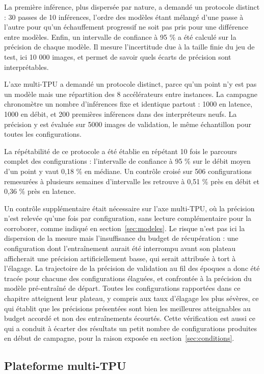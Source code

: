 \documentclass[11pt,a4paper]{report}
\begin{document}
La première inférence, plus dispersée par nature, a demandé un protocole distinct : 30 passes de 10 inférences, l'ordre des modèles étant mélangé d'une passe à l'autre pour qu'un échauffement progressif ne soit pas pris pour une différence entre modèles. Enfin, un intervalle de confiance à 95 \% a été calculé sur la précision de chaque modèle. Il mesure l'incertitude due à la taille finie du jeu de test, ici 10 000 images, et permet de savoir quels écarts de précision sont interprétables.

L'axe multi-TPU a demandé un protocole distinct, parce qu'un point n'y est pas un modèle mais une répartition des 8 accélérateurs entre instances. La campagne chronomètre un nombre d'inférences fixe et identique partout : 1000 en latence, 1000 en débit, et 200 premières inférences dans des interpréteurs neufs. La précision y est évaluée sur 5000 images de validation, le même échantillon pour toutes les configurations.

La répétabilité de ce protocole a été établie en répétant 10 fois le parcours complet des configurations : l'intervalle de confiance à 95 \% sur le débit moyen d'un point y vaut 0,18 \% en médiane. Un contrôle croisé sur 506 configurations remesurées à plusieurs semaines d'intervalle les retrouve à 0,51 \% près en débit et 0,36 \% près en latence.

Un contrôle supplémentaire était nécessaire sur l'axe multi-TPU, où la précision n'est relevée qu'une fois par configuration, sans lecture complémentaire pour la corroborer, comme indiqué en section~\ref{sec:modeles}. Le risque n'est pas ici la dispersion de la mesure mais l'insuffisance du budget de récupération : une configuration dont l'entraînement aurait été interrompu avant son plateau afficherait une précision artificiellement basse, qui serait attribuée à tort à l'élagage. La trajectoire de la précision de validation au fil des époques a donc été tracée pour chacune des configurations élaguées, et confrontée à la précision du modèle pré-entraîné de départ. Toutes les configurations rapportées dans ce chapitre atteignent leur plateau, y compris aux taux d'élagage les plus sévères, ce qui établit que les précisions présentées sont bien les meilleures atteignables au budget accordé et non des entraînements écourtés. Cette vérification est aussi ce qui a conduit à écarter des résultats un petit nombre de configurations produites en début de campagne, pour la raison exposée en section~\ref{sec:conditions}.

\subsection{Plateforme multi-TPU}
\end{document}
